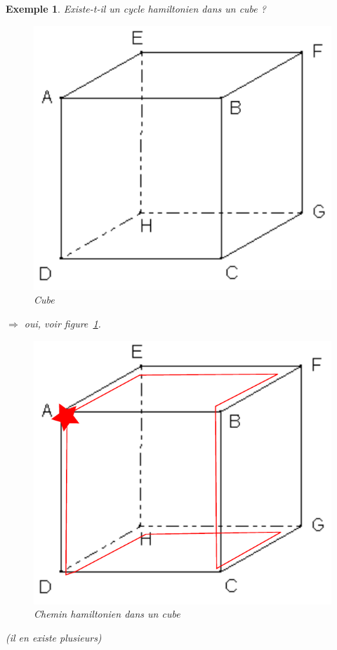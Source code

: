 \documentclass[12pt]{article}
\newtheorem{exemple}{Exemple}[section]
\begin{document}
\begin{exemple} Existe-t-il un cycle hamiltonien dans un cube ? \\
\begin{figure}[h!]
    \begin{center}
    \includegraphics[scale=0.3]{cube.pdf}
    \caption{Cube}
    \end{center}
\end{figure}
$\Longrightarrow$ oui, voir figure~\ref{chcube}.
\begin{figure}[h!]
    \begin{center}
    \includegraphics[scale=0.3]{cubehc.pdf}
    \caption{Chemin hamiltonien dans un cube}
    \label{chcube}
    \end{center}
\end{figure}

(il en existe plusieurs)

\end{exemple}
\end{document}
